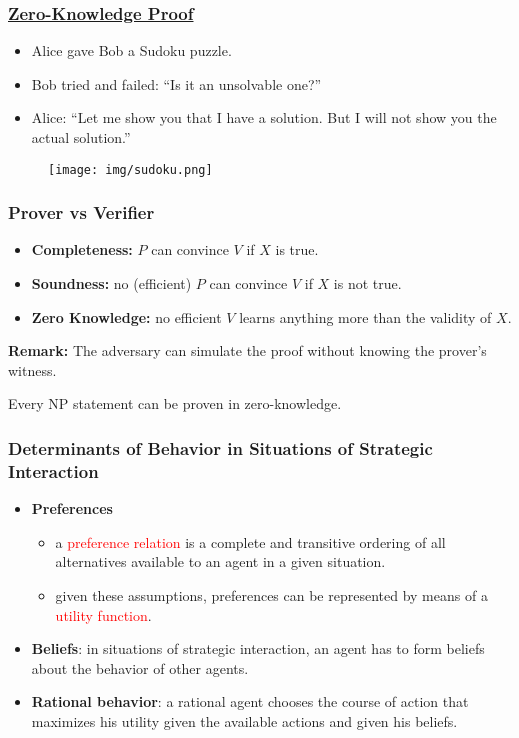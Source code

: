\documentclass[UTF8,11pt,colorlinks,compress,openany]{beamer}%
\begin{document}
\begin{frame}\frametitle{\href{https://zhuanlan.zhihu.com/p/34072069}{Zero-Knowledge Proof}}
	\begin{itemize}
		\item Alice gave Bob a Sudoku puzzle.
		\item Bob tried and failed: ``Is it an unsolvable one?''
		\item Alice: ``Let me show you that I have a solution. But I will not show you the actual solution.''
	\end{itemize}
\begin{figure}
\texttt{[image: img/sudoku.png]}
\end{figure}
\end{frame}

\begin{frame}\frametitle{Prover vs Verifier}
	\begin{itemize}
		\item \textbf{Completeness:} $P$ can convince $V$ if $X$ is true.
		\item \textbf{Soundness:} no (efficient) $P$ can convince $V$ if $X$ is not true.
		\item \textbf{Zero Knowledge:} no efficient $V$ learns anything more than the validity of $X$.
	\end{itemize}
	\textbf{Remark:} The adversary can simulate the proof without knowing the prover's witness.
	\begin{theorem}
		Every NP statement can be proven in zero-knowledge.
	\end{theorem}
\end{frame}

\begin{frame}\frametitle{Determinants of Behavior in Situations of Strategic Interaction}
\begin{itemize}
	\item \textbf{Preferences}
	\begin{itemize}
		\item a \textcolor{red}{preference relation} is a complete and transitive ordering of all alternatives available to an agent in a given situation.
		\item given these assumptions, preferences can be represented by means of a \textcolor{red}{utility function}.
	\end{itemize}
	\item \textbf{Beliefs}: in situations of strategic interaction, an agent has to form beliefs about the behavior of other agents.
	\item \textbf{Rational behavior}: a rational agent chooses the course of action that maximizes his utility given the available actions and given his beliefs.
\end{itemize}
\end{frame}
\end{document}
